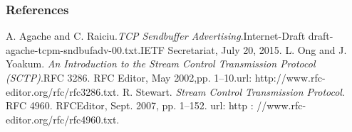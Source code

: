 \documentclass{beamer}
\begin{document}
\begin{frame}[allowframebreaks]
  \frametitle<presentation>{References}   

\begin{thebibliography}{100}
A. Agache and C. Raiciu.\textit{TCP Sendbuffer Advertising}.Internet-Draft draft-agache-tcpm-sndbufadv-00.txt.IETF Secretariat, July 20, 2015.
L. Ong and J. Yoakum. \textit{An Introduction to the Stream Control Transmission Protocol (SCTP)}.RFC 3286. RFC Editor, May 2002,pp. 1–10.\newline url: http://www.rfc-editor.org/rfc/rfc3286.txt.
R. Stewart. \textit{Stream Control Transmission Protocol}. RFC 4960. RFCEditor, Sept. 2007, pp. 1–152. \newline url: http : //www.rfc-editor.org/rfc/rfc4960.txt.
\end{thebibliography}{}
\end{frame}
\end{document}
